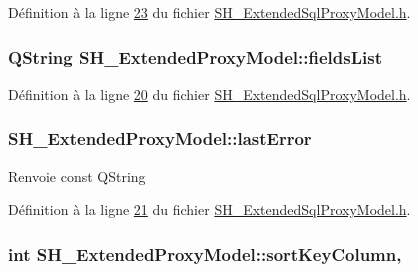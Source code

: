 Définition à la ligne \hyperlink{SH__ExtendedSqlProxyModel_8h_source_l00023}{23} du fichier \hyperlink{SH__ExtendedSqlProxyModel_8h_source}{S\-H\-\_\-\-Extended\-Sql\-Proxy\-Model.\-h}.

\hypertarget{classSH__ExtendedProxyModel_a15e779ba92384a57442d6bd79ef3d1d1}{
\subsubsection[{fields\-List}]{\setlength{\rightskip}{0pt plus 5cm}Q\-String S\-H\-\_\-\-Extended\-Proxy\-Model\-::fields\-List\hspace{0.3cm}{\ttfamily [read]}}}\label{classSH__ExtendedProxyModel_a15e779ba92384a57442d6bd79ef3d1d1}


Définition à la ligne \hyperlink{SH__ExtendedSqlProxyModel_8h_source_l00020}{20} du fichier \hyperlink{SH__ExtendedSqlProxyModel_8h_source}{S\-H\-\_\-\-Extended\-Sql\-Proxy\-Model.\-h}.

\hypertarget{classSH__ExtendedProxyModel_a287d34971582bbe68a7f1f0826165de5}{
\subsubsection[{last\-Error}]{\setlength{\rightskip}{0pt plus 5cm}S\-H\-\_\-\-Extended\-Proxy\-Model\-::last\-Error\hspace{0.3cm}{\ttfamily [read]}}}\label{classSH__ExtendedProxyModel_a287d34971582bbe68a7f1f0826165de5}
\begin{DoxyReturn}{Renvoie}
const Q\-String 
\end{DoxyReturn}


Définition à la ligne \hyperlink{SH__ExtendedSqlProxyModel_8h_source_l00021}{21} du fichier \hyperlink{SH__ExtendedSqlProxyModel_8h_source}{S\-H\-\_\-\-Extended\-Sql\-Proxy\-Model.\-h}.

\hypertarget{classSH__ExtendedProxyModel_a47e2d0b99b84fb066438db667dd1ad26}{
\subsubsection[{sort\-Key\-Column}]{\setlength{\rightskip}{0pt plus 5cm}int S\-H\-\_\-\-Extended\-Proxy\-Model\-::sort\-Key\-Column\hspace{0.3cm}{\ttfamily [read]}, {\ttfamily [write]}}}\label{classSH__ExtendedProxyModel_a47e2d0b99b84fb066438db667dd1ad26}


